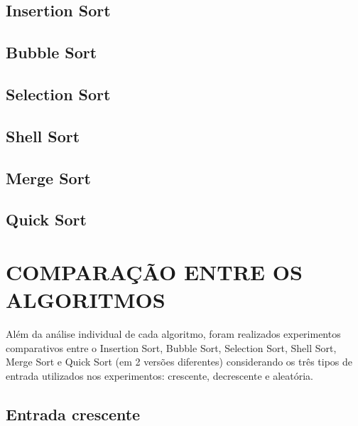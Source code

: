 \documentclass[12pt,a4paper]{article}
\begin{document}
\subsection{Insertion Sort}


\subsection{Bubble Sort}


\subsection{Selection Sort}


\subsection{Shell Sort}


\subsection{Merge Sort}


\subsection{Quick Sort}


\newpage


\section{COMPARAÇÃO ENTRE OS ALGORITMOS}

Além da análise individual de cada algoritmo, foram realizados
experimentos comparativos entre o Insertion Sort, Bubble Sort,
Selection Sort, Shell Sort, Merge Sort e Quick Sort (em 2 versões diferentes)
considerando os três tipos de entrada utilizados nos experimentos: 
crescente, decrescente e aleatória.

\subsection{Entrada crescente}

\end{document}
